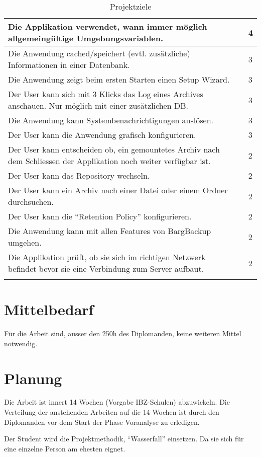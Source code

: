 \begin{longtable}{|p{9cm}|p{1.5cm}|p{2cm}|}
\hline
Die Applikation verwendet, wann immer möglich allgemeingültige Umgebungsvariablen. &  & 4\\
\hline
Die Anwendung cached/speichert (evtl. zusätzliche) Informationen in einer Datenbank. &  & 3\\
\hline
Die Anwendung zeigt beim ersten Starten einen Setup Wizard. &  & 3\\
\hline
Der User kann sich mit 3 Klicks das Log eines Archives anschauen. Nur möglich mit einer zusätzlichen DB. &  & 3\\
\hline
Die Anwendung kann Systembenachrichtigungen auslösen. &  & 3\\
\hline
Der User kann die Anwendung grafisch konfigurieren. &  & 3\\
\hline
Der User kann entscheiden ob, ein gemountetes Archiv nach dem Schliessen der Applikation noch weiter verfügbar ist. &  & 2\\
\hline
Der User kann das Repository wechseln. &  & 2\\
\hline
Der User kann ein Archiv nach einer Datei oder einem Ordner durchsuchen. &  & 2\\
\hline
Der User kann die "`Retention Policy"' konfigurieren. &  & 2\\
\hline
Die Anwendung kann mit allen Features von BargBackup umgehen. &  & 2\\
\hline
Die Applikation prüft, ob sie sich im richtigen Netzwerk befindet bevor sie eine Verbindung zum Server aufbaut. &  & 2\\
\hline
\caption{\label{tab:org47b33b1}
Projektziele}
\\
\end{longtable}
\newpage
\section{Mittelbedarf}
\label{sec:org5a06f83}
Für die Arbeit sind, ausser den 250h des Diplomanden, keine weiteren Mittel
notwendig.

\section{Planung}
\label{sec:orgf49c646}

Die Arbeit ist innert 14 Wochen (Vorgabe IBZ-Schulen) abzuwickeln. Die
Verteilung der anstehenden Arbeiten auf die 14 Wochen ist durch den Diplomanden
vor dem Start der Phase Voranalyse zu erledigen.

Der Student wird die Projektmethodik, "`Wasserfall"' einsetzen. Da sie sich für
eine einzelne Person am ehesten eignet.

